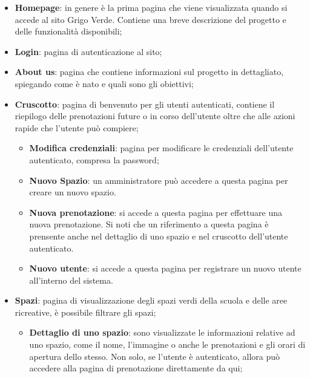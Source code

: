 \begin{itemize}
	\item \textbf{Homepage}: in genere è la prima pagina che viene visualizzata
	      quando si accede al sito Grigo Verde. Contiene una breve descrizione
	      del progetto e delle funzionalità disponibili;

	\item \textbf{Login}: pagina di autenticazione al sito;

	\item \textbf{About us}: pagina che contiene informazioni sul progetto in
	      dettagliato, spiegando come è nato e quali sono gli obiettivi;

	\item \textbf{Cruscotto}: pagina di benvenuto per gli utenti autenticati,
	      contiene il riepilogo delle prenotazioni future o in corso dell'utente
	      oltre che alle azioni rapide che l'utente può compiere;

	      \begin{itemize}
		      \item \textbf{Modifica credenziali}: pagina per modificare le
		            credenziali dell'utente autenticato, compresa la password;

		      \item \textbf{Nuovo Spazio}: un amministratore può accedere a
		            questa pagina per creare un nuovo spazio.

		      \item \textbf{Nuova prenotazione}: si accede a questa pagina per
		            effettuare una nuova prenotazione. Si noti che un
		            riferimento a questa pagina è prensente anche nel dettaglio
		            di uno spazio e nel cruscotto dell'utente autenticato.

		      \item \textbf{Nuovo utente}: si accede a questa pagina per
		            registrare un nuovo utente all'interno del sistema.
	      \end{itemize}

	\item \textbf{Spazi}: pagina di visualizzazione degli spazi verdi della
	      scuola e delle aree ricreative, è possibile filtrare gli spazi;

	      \begin{itemize}
		      \item \textbf{Dettaglio di uno spazio}: sono visualizzate le
		            informazioni relative ad uno spazio, come il nome,
		            l'immagine o anche le prenotazioni e gli orari di apertura
		            dello stesso. Non solo, se l'utente è autenticato, allora
		            può accedere alla pagina di prenotazione direttamente da
		            qui;


\end{itemize}
\end{itemize}
